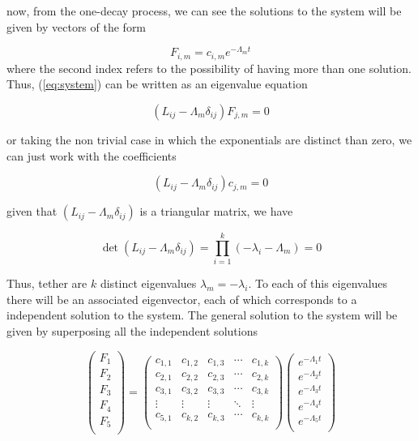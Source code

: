 \documentclass{article}
\theoremstyle{definition}
\theoremstyle{remark}
\begin{document}
now, from the one-decay process, we can see the solutions to the system will be given by vectors of the form

\begin{equation}
	F_{i,m}=c_{i,m}e^{-\Lambda_{m}t}
\end{equation}
where the second index refers to the possibility of having more than one solution. Thus, (\ref{eq:system}) can be written as an eigenvalue equation

\begin{equation}
	(L_{ij}-\Lambda_{m}\delta_{ij})F_{j,m}=0
\end{equation}

or taking the non trivial case in which the exponentials are distinct than zero, we can just work with the coefficients

\begin{equation}
	(L_{ij}-\Lambda_{m}\delta_{ij})c_{j,m}=0
\end{equation}

given that $(L_{ij}-\Lambda_{m}\delta_{ij})$ is a triangular matrix, we have

\begin{equation}
	\det(L_{ij}-\Lambda_{m}\delta_{ij})=\prod_{i=1}^{k}(-\lambda_{i}-\Lambda_{m})=0
\end{equation}

Thus, tether are $k$ distinct eigenvalues $\lambda_{m}=-\lambda_{i}$. To each of this eigenvalues there will be an associated eigenvector, each of which corresponds to a independent solution to the system. The general solution to the system will be given by superposing all the independent solutions

\begin{equation}
	\begin{pmatrix}
		F_{1} \\
		F_{2} \\
		F_{3} \\
		F_{4} \\
		F_{5} \\
	\end{pmatrix}=\begin{pmatrix}
		c_{1,1} & c_{1,2} & c_{1,3} & \cdots & c_{1,k} \\
		c_{2,1} & c_{2,2} & c_{2,3} & \cdots & c_{2,k} \\
		c_{3,1} & c_{3,2} & c_{3,3} & \cdots & c_{3,k} \\
		\vdots  & \vdots  & \vdots  & \ddots & \vdots  \\
		c_{5,1} & c_{k,2} & c_{k,3} & \cdots & c_{k,k} \\
	\end{pmatrix}\begin{pmatrix}
		e^{-\Lambda_{1}t} \\
		e^{-\Lambda_{2}t} \\
		e^{-\Lambda_{3}t} \\
		e^{-\Lambda_{4}t} \\
		e^{-\Lambda_{5}t} \\
	\end{pmatrix}
\end{equation}
\end{document}
